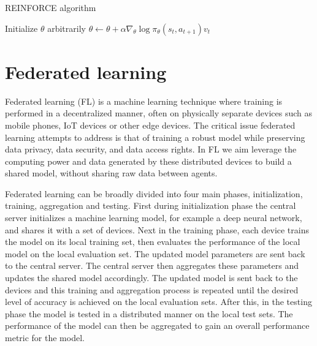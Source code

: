 \begin{algorithm}
    \caption{REINFORCE algorithm}\label{alg:REINFORCE}
    \begin{algorithmic}
            \State Initialize $\theta$ arbitrarily
                    \State $\theta \leftarrow \theta + \alpha \nabla_\theta \log \pi_\theta(s_t,a_{t+1})v_t$ 
                \EndFor
            \EndFor
    \end{algorithmic}
\end{algorithm}




\section{Federated learning}


Federated learning (FL) \cite{FederatedLearning} is a machine learning technique where training is performed in a decentralized manner, often on physically separate devices such as mobile phones, IoT devices or other edge devices. 
The critical issue federated learning attempts to address is that of training a robust model while preserving data privacy, data security, and data access rights.
In FL we aim leverage the computing power and data generated by these distributed devices to build a shared model, without sharing raw data between agents.

Federated learning can be broadly divided into four main phases, initialization, training, aggregation and testing. 
First during initialization phase the central server initializes a machine learning model, for example a deep neural network, and shares it with a set of devices. 
Next in the training phase, each device trains the model on its local training set, then evaluates the performance of the local model on the local evaluation set. 
The updated model parameters are sent back to the central server. 
The central server then aggregates these parameters and updates the shared model accordingly.
The updated model is sent back to the devices and this training and aggregation process is repeated until the desired level of accuracy is achieved on the local evaluation sets.
After this, in the testing phase the model is tested in a distributed manner on the local test sets. The performance of the model can then be aggregated to gain an overall performance metric for the model.

